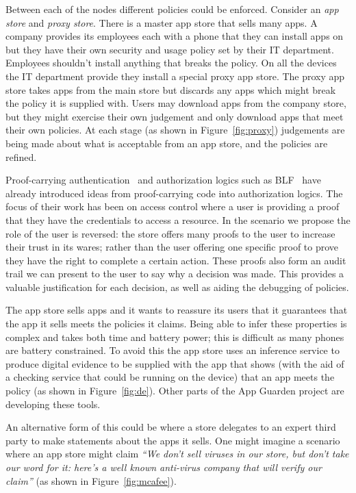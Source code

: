 \documentclass[a4paper]{article}
\begin{document}
Between each of the nodes different policies could be enforced.  Consider an
\emph{app store} and \emph{proxy store}.  There is a master app store that sells
many apps.  A company provides its employees each with a phone that they can
install apps on but they have their own security and usage policy set by their
IT department.  Employees shouldn't install anything that breaks the policy. On
all the devices the IT department provide they install a special proxy app
store.  The proxy app store takes apps from the main store but discards any apps
which might break the policy it is supplied with.  Users may download apps from
the company store, but they might exercise their own judgement and only download
apps that meet their own policies.  At each stage (as shown in
Figure~\ref{fig:proxy}) judgements are being made about what is acceptable from
an app store, and the policies are refined.

Proof-carrying authentication~\cite{Appel:1999dq} and authorization logics such
as BLF~\cite{Whitehead:2004bu} have already introduced ideas from proof-carrying
code into authorization logics. The focus of their work has been on access
control where a user is providing a proof that they have the credentials to
access a resource.   In the scenario we propose the role of the user is
reversed: the store offers many proofs to the user to increase their trust in
its wares; rather than the user offering one specific proof to prove they have
the right to complete a certain action.  These proofs also form an audit trail
we can present to the user to say why a decision was made.  This provides a
valuable justification for each decision, as well as aiding the debugging of
policies.

The app store sells apps and it wants to reassure its users that
it guarantees that the app it sells meets the policies it
claims.  Being able to infer these properties is complex and takes both time and
battery power; this is difficult as many phones are battery constrained.  To
avoid this the app store uses an inference service to produce digital evidence
to be supplied with the app that shows (with the aid of a checking service that
could be running on the device) that an app meets the policy (as shown in
Figure~\ref{fig:de}). Other parts of the App Guarden project are 
developing these tools.

An alternative form of this could be where a store delegates to an expert third
party to make statements about the apps it sells.  One might imagine a scenario
where an app store might claim \emph{``We don't sell viruses in our store, but
don't take our word for it: here's a well known anti-virus company that will
verify our claim''} (as shown in Figure~\ref{fig:mcafee}).
\end{document}
